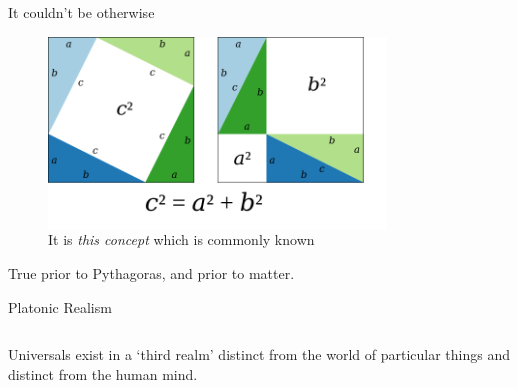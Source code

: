 \documentclass[xcolor=dvipsnames]{beamer}
\begin{document}
\begin{frame}{It couldn't be otherwise}
\begin{figure}
  \centering
  \begin{columns}
    \centering
    \caption {It is \emph{this concept} which is commonly known}
    \includegraphics[width=0.8\textwidth]{pythagoras_proof}
  \end{columns}
\end{figure}
True prior to Pythagoras, and prior to matter.
\end{frame}



\begin{frame}{Platonic Realism}
  \begin{columns}
Universals exist in a `third realm' distinct from the world of particular things {and} distinct from the human mind.
  \end{columns}
\end{frame}
\end{document}
